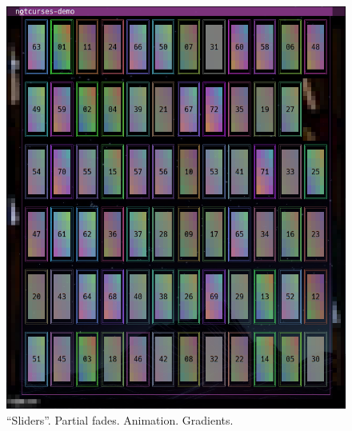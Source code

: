 \documentclass[letterpaper,10pt]{article}
\begin{document}
\begin{figure}
\begin{minipage}{0.45\textwidth}
    \includegraphics[width=1\linewidth]{media/demo-sliders.png}
    \caption{``Sliders''. Partial fades. Animation. Gradients.}
  \end{minipage}\hfill
\end{figure}
\end{document}
